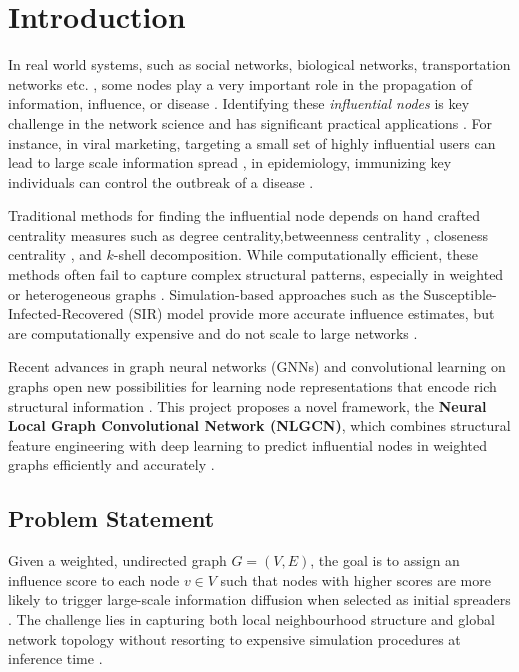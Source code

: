 \chapter{Introduction}

In real world systems, such as social networks, biological
networks, transportation networks etc. , some nodes
play a very important role in the propagation of
information, influence, or disease \cite{hafiene2020, chen2012,
farooq2018}. Identifying these \textit{influential nodes} is key
challenge in the network science and has significant practical applications
\cite{hafiene2020}. For instance, in viral marketing, targeting a small
set of highly influential users can lead to large scale information
spread \cite{hafiene2020, guo2026}, in epidemiology, immunizing key
individuals can control the outbreak of a disease \cite{chen2012}.

Traditional methods for finding the influential node depends on hand crafted
centrality measures such as degree centrality,betweenness centrality \cite{farooq2018}, closeness centrality
\cite{farooq2018}, and $k$-shell decomposition. While
computationally efficient, these methods often fail to capture complex
structural patterns, especially in weighted or heterogeneous graphs
\cite{mukhtar, chen2012}. Simulation-based approaches such as the
Susceptible-Infected-Recovered (SIR) model provide
more accurate influence estimates, but are computationally expensive and
do not scale to large networks \cite{guo2026, patel2025}.

Recent advances in graph neural networks (GNNs) and convolutional
learning on graphs \cite{zhang2019gcn} open new possibilities
for learning node representations that encode rich structural information
\cite{tu2025, patel2025}. This project proposes a novel framework, the
\textbf{Neural Local Graph Convolutional Network (NLGCN)}, which
combines structural feature engineering with deep learning to predict
influential nodes in weighted graphs efficiently and accurately
\cite{guo2026}.

\section{Problem Statement}

Given a weighted, undirected graph $G = (V, E)$, the goal is to assign
an influence score to each node $v \in V$ such that nodes with higher
scores are more likely to trigger large-scale information diffusion when
selected as initial spreaders \cite{hafiene2020, chen2012}. The
challenge lies in capturing both local neighbourhood structure and
global network topology \cite{mukhtar, guo2026} without resorting to
expensive simulation procedures at inference time \cite{patel2025}.

